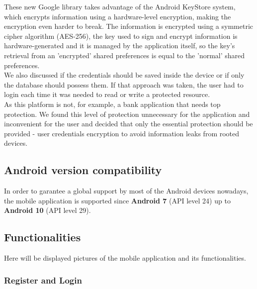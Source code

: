 These new Google library takes advantage of the Android KeyStore\cite{keystore} system, which encrypts information using a hardware-level encryption, making the
encryption even harder to break. The information is encrypted using a symmetric cipher algorithm (AES-256), the key used to sign and encrypt information
is hardware-generated and it is managed by the application itself, so the key's retrieval from an 'encrypted' shared preferences is equal to the 'normal'
shared preferences.\\

We also discussed if the credentials should be saved inside the device or if only the database should possess them.
If that approach was taken, the user had to login each time it was needed to read or write a protected resource.\\

As this platform is not, for example, a bank application that needs top protection. We found this level of protection
unnecessary for the application and inconvenient for the user and decided that only the essential protection should be provided - 
user credentials encryption to avoid information leaks from rooted devices.

\subsection{Android version compatibility}

In order to garantee a global support by most of the Android devices nowadays, the mobile application is supported since \textbf{Android 7} (API level 24)
up to \textbf{Android 10} (API level 29).

\subsection{Functionalities}

Here will be displayed pictures of the mobile application and its functionalities.\\

\subsubsection{Register and Login}

